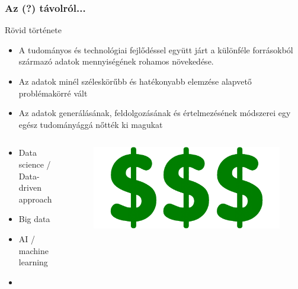 \begin{frame}
\frametitle{Az (?) távolról...}

\begin{block}{Rövid története}
	\begin{itemize}
		\item A tudományos és technológiai fejlődéssel együtt járt a különféle forrásokból származó adatok mennyiségének rohamos növekedése.
		\item Az adatok minél széleskörűbb és hatékonyabb elemzése alapvető problémakörré vált
		\item Az adatok generálásának, feldolgozásának és értelmezésének módszerei egy egész tudományággá nőtték ki magukat
	\end{itemize}
\end{block}

\pause

\begin{columns}
\begin{column}{0.6\textwidth}
	\begin{exampleblock}{}
		\begin{itemize}
			\item Data science / Data-driven approach
			\item Big data
			\item AI / machine learning
			\item {}
		\end{itemize}
	\end{exampleblock}
\end{column}

\pause

\begin{column}{0.38\textwidth}
	\begin{figure}
		\includegraphics[width=1.0\textwidth]{img/dollar.png}
	\end{figure}
\end{column}
\end{columns}

\end{frame}